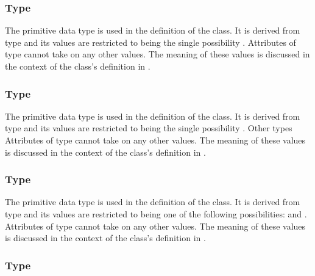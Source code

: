 \subsubsection{Type \fixttspace{}}
\label{primtype-FunctionKind}

The  primitive data type is used in the definition of the \AnalyticVolume class.  It is derived from type  and its values are restricted to being the single possibility .  Attributes of type  cannot take on any other values.  The meaning of these values is discussed in the context of the \AnalyticVolume class's definition in .


\subsubsection{Type \fixttspace{}}
\label{primtype-GeometryKind}

The  primitive data type is used in the definition of the \Geometry class.  It is derived from type  and its values are restricted to being the single possibility .  Other  types   Attributes of type  cannot take on any other values.  The meaning of these values is discussed in the context of the \Geometry class's definition in .


\subsubsection{Type \fixttspace{}}
\label{primtype-InterpolationKind}

The  primitive data type is used in the definition of the \SampledField class.  It is derived from type  and its values are restricted to being one of the following possibilities:  and .  Attributes of type  cannot take on any other values.  The meaning of these values is discussed in the context of the \SampledField class's definition in .


\subsubsection{Type \fixttspace{}}
\label{primtype-PolygonKind}

